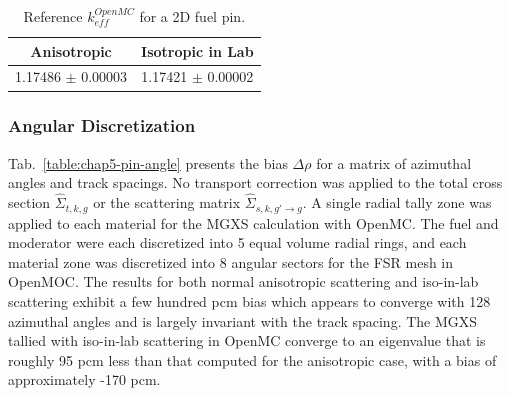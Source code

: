 \begin{table}[h!]
  \centering
  \caption[Reference $k^{OpenMC}_{eff}$ for a 2D fuel pin]{Reference $k^{OpenMC}_{eff}$ for a 2D fuel pin.}
  \label{table:chap5-pin-reference} 
  \vspace{6pt}
  \begin{tabular}{c c}
  \toprule
  \rowcolor{lightgray}
  {\bf Anisotropic} &
  {\bf Isotropic in Lab} \\
  \midrule
  1.17486 $\pm$ 0.00003 & 1.17421 $\pm$ 0.00002 \\
  \bottomrule
\end{tabular}
\end{table}

\subsubsection{Angular Discretization}
\label{subsubsec:chap5-pin-angle}

Tab.~\ref{table:chap5-pin-angle} presents the bias $\Delta\rho$ for a matrix of azimuthal angles and track spacings. No transport correction was applied to the total cross section $\hat{\Sigma}_{t,k,g}$ or the scattering matrix $\hat{\Sigma}_{s,k,g'\rightarrow g}$. A single radial tally zone was applied to each material for the \ac{MGXS} calculation with OpenMC. The fuel and moderator were each discretized into 5 equal volume radial rings, and each material zone was discretized into 8 angular sectors for the \ac{FSR} mesh in OpenMOC. The results for both normal anisotropic scattering and iso-in-lab scattering exhibit a few hundred \ac{pcm} bias which appears to converge with 128 azimuthal angles and is largely invariant with the track spacing. The \ac{MGXS} tallied with iso-in-lab scattering in OpenMC converge to an eigenvalue that is roughly 95 \ac{pcm} less than that computed for the anisotropic case, with a bias of approximately -170 pcm.

